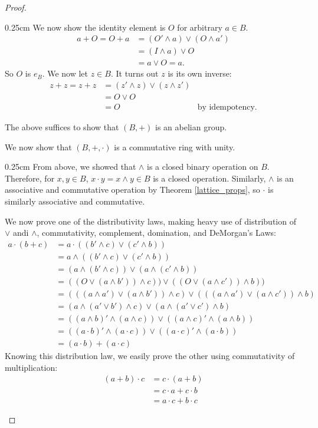 \documentclass[10pt, letterpaper]{article}
\newenvironment{tabOver}[1]
{\begin{adjustwidth}{#1cm}{}}{\end{adjustwidth}}
\theoremstyle{definition}
\begin{document}
\begin{proof}
\begin{tabOver}{0.25}
		We now show the identity element is $O$ for arbitrary \(a\in B\).
		\begin{align*}
				a+O=O+a&=(O'\wedge a)\vee(O\wedge a')\\
				   &=(I\wedge a)\vee O\\
				   &=a\vee O= a. 
		\end{align*}
		So $O$ is \(e_B\). We now let \(z\in B\). It turns out \(z\) is its own inverse:
		\begin{align*}
			z+z=z+z&=(z'\wedge z)\vee(z\wedge z') \\
				   &=O\vee O \\
				   &=O&\text{by idempotency.}
		\end{align*}

		The above suffices to show that \((B, +)\) is an abelian group.
	\end{tabOver}
	We now show that \((B, +, \cdot)\) is a commutative ring with unity.
	\begin{tabOver}{0.25}
		From above, we showed that \(\wedge\) is a closed binary operation on \(B\).
		Therefore, for \(x,y\in B\), \(x\cdot y=x\wedge y\in B\) is a closed operation.
		Similarly, \(\wedge\) is an associative and commutative operation by 
		Theorem \ref{lattice_props}, so \(\cdot\) is similarly associative and commutative.

		We now prove one of the distributivity laws, making heavy use of
		distribution of \(\vee\) andi \(\wedge\), commutativity, complement, 
		domination, and DeMorgan's Laws:
		\begin{align*}
			a\cdot (b + c)&=a\cdot((b'\wedge c)\vee(c'\wedge b)) \\
						  &=a\wedge((b'\wedge c)\vee(c'\wedge b)) \\
						  &=(a\wedge(b'\wedge c))\vee(a\wedge(c'\wedge b)) \\
						  &=((O\vee(a\wedge b'))\wedge c))\vee((O\vee(a\wedge c'))\wedge b))\\
						  &=(((a\wedge a')\vee(a\wedge b'))\wedge c)
						  	\vee(((a\wedge a')\vee(a\wedge c'))\wedge b)\\
						  &=(a\wedge(a'\vee b')\wedge c)\vee
						  	(a\wedge(a'\vee c')\wedge b)\\
						  &=((a\wedge b)'\wedge(a\wedge c))\vee
						   ((a\wedge c)'\wedge(a\wedge b))\\
						  &=((a\cdot b)'\wedge(a\cdot c))\vee
						  	((a\cdot c)'\wedge(a\cdot b))\\
						  &=(a\cdot b)+(a\cdot c)
		\end{align*}
		Knowing this distribution law, 
		we easily prove the other using commutativity of multiplication:
		\begin{align*}
			(a+b)\cdot c&=c\cdot(a+b)\\
					&=c\cdot a + c\cdot b\\
					&=a\cdot c + b\cdot c
		\end{align*}


\end{tabOver}
\end{proof}
\end{document}
